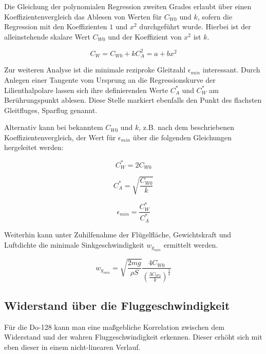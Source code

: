 \documentclass[11pt]{scrartcl}
\begin{document}
Die Gleichung der polynomialen Regression zweiten Grades erlaubt über einen Koeffizientenvergleich das Ablesen von Werten für $C_{W0}$ und $k$, sofern die Regression mit den Koeffizienten $1$ und $x^{2}$ durchgeführt wurde. Hierbei ist der alleinstehende skalare Wert $C_{W0}$ und der Koeffizient von $x^{2}$ ist $k$.

\begin{equation*}
  C_{W} = C_{W0} + k C_{A}^{2} = a + b x^{2}
\end{equation*}

Zur weiteren Analyse ist die minimale reziproke Gleitzahl $\epsilon_{min}$ interessant. Durch Anlegen einer Tangente vom Ursprung an die Regressionskurve der Lilienthalpolare lassen sich ihre definierenden Werte $C_{A}^{*}$ und $C_{W}^{*}$ am Berührungspunkt ablesen. Diese Stelle markiert ebenfalls den Punkt des flachsten Gleitfluges, Sparflug genannt.

Alternativ kann bei bekanntem $C_{W0}$ und $k$, z.B. nach dem beschriebenen Koeffizientenvergleich, der Wert für $\epsilon_{min}$ über die folgenden Gleichungen hergeleitet werden:

\begin{equation*}
  C_{W}^{*} = 2 C_{W0}
\end{equation*}

\begin{equation*}
  C_{A}^{*} = \sqrt{\frac{C_{W0}}{k}}
\end{equation*}

\begin{equation*}
  \epsilon_{min} = \frac{C_{W}^{*}}{C_{A}^{*}}
\end{equation*}

Weiterhin kann unter Zuhilfenahme der Flügelfläche, Gewichtskraft und Luftdichte die minimale Sinkgeschwindigkeit $w_{g_{min}}$ ermittelt werden.



\begin{equation*}
	w_{g_{min}} = \sqrt{\frac{2mg}{\rho S}} \frac{4C_{W0}}{\left( \frac{3C_{W0}}{k}\right)^{\frac{3}{4}}}
\end{equation*}

	
	\subsection{Widerstand über die Fluggeschwindigkeit}
	
Für die Do-128 kann man eine maßgebliche Korrelation zwischen dem Widerstand und der wahren Fluggeschwindigkeit erkennen. Dieser erhöht sich mit eben dieser in einem  nicht-linearen Verlauf.
\end{document}
